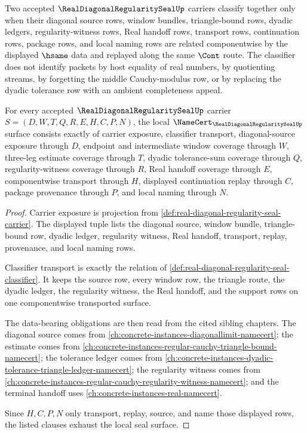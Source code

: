 \begin{definition}
\label{def:real-diagonal-regularity-seal-classifier}
Two accepted $\RealDiagonalRegularitySealUp$ carriers classify together only when their diagonal source rows, window bundles, triangle-bound rows, dyadic ledgers, regularity-witness rows, Real handoff rows, transport rows, continuation rows, package rows, and local naming rows are related componentwise by the displayed $\hsame$ data and replayed along the same $\Cont$ route. The classifier does not identify packets by host equality of real numbers, by quotienting streams, by forgetting the middle Cauchy-modulus row, or by replacing the dyadic tolerance row with an ambient completeness appeal.
\end{definition}

\begin{theorem}
\label{thm:real-diagonal-regularity-seal-obligations}
For every accepted $\RealDiagonalRegularitySealUp$ carrier $S=(D,W,T,Q,R,E,H,C,P,N)$, the local $\NameCert_{\RealDiagonalRegularitySealUp}$ surface consists exactly of carrier exposure, classifier transport, diagonal-source exposure through $D$, endpoint and intermediate window coverage through $W$, three-leg estimate coverage through $T$, dyadic tolerance-sum coverage through $Q$, regularity-witness coverage through $R$, Real handoff coverage through $E$, componentwise transport through $H$, displayed continuation replay through $C$, package provenance through $P$, and local naming through $N$.
\end{theorem}
\begin{proof}
Carrier exposure is projection from \autoref{def:real-diagonal-regularity-seal-carrier}. The displayed tuple lists the diagonal source, window bundle, triangle-bound row, dyadic ledger, regularity witness, Real handoff, transport, replay, provenance, and local naming rows.

Classifier transport is exactly the relation of \autoref{def:real-diagonal-regularity-seal-classifier}. It keeps the source row, every window row, the triangle route, the dyadic ledger, the regularity witness, the Real handoff, and the support rows on one componentwise transported surface.

The data-bearing obligations are then read from the cited sibling chapters. The diagonal source comes from \autoref{ch:concrete-instances-diagonallimit-namecert}; the estimate comes from \autoref{ch:concrete-instances-regular-cauchy-triangle-bound-namecert}; the tolerance ledger comes from \autoref{ch:concrete-instances-dyadic-tolerance-triangle-ledger-namecert}; the regularity witness comes from \autoref{ch:concrete-instances-regular-cauchy-regularity-witness-namecert}; and the terminal handoff uses \autoref{ch:concrete-instances-real-namecert}.

Since $H,C,P,N$ only transport, replay, source, and name those displayed rows, the listed clauses exhaust the local seal surface.
\end{proof}

